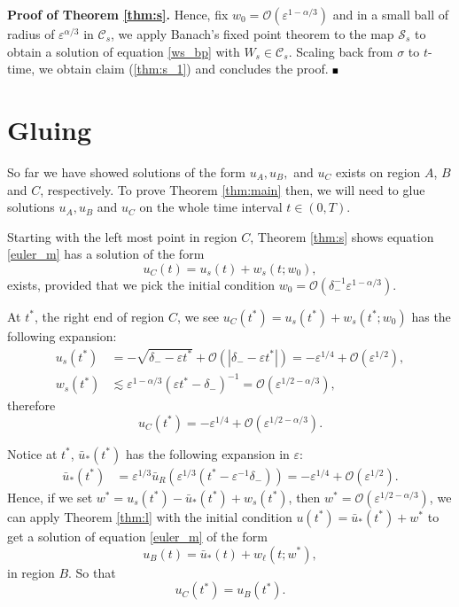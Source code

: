 \documentclass[letterpaper,11pt]{article}
\newcommand{\rmO}{\mathcal{O}}
\newcommand{\eps}{\varepsilon}
\newcommand{\lar}{ \lesssim }
\numberwithin{equation}{section}
\theoremstyle{plain}
\newenvironment{Proof}[1][.]%
 {\begin{trivlist}\item[]\textbf{Proof#1 }}%
 {\hspace*{\fill}$\rule{0.3\baselineskip}{0.35\baselineskip}$\end{trivlist}}
\begin{document}
\begin{Proof}[ of Theorem \ref{thm:s}.]
Hence, fix $w_0 = \rmO(\eps^{1-\alpha/3})$ and in a small ball of radius of $\eps^{\alpha/3}$ in $\mathcal{C}_s$, we apply Banach's fixed point theorem to the map $\mathcal{S}_s$ to obtain a solution of equation \eqref{ws_bp} with $W_s \in \mathcal{C}_s$. Scaling back from $\sigma$ to $t$-time, we obtain claim (\ref{thm:s_1}) and concludes the proof.
\end{Proof}

\section{Gluing}\label{sec_glue}
So far we have showed solutions of the form $u_A,u_B,$ and $u_C$ exists on region $A$, $B$ and $C$, respectively. To prove Theorem \ref{thm:main} then, we will need to glue solutions $u_A, u_B$ and $u_C$ on the whole time interval $t \in (0,T)$.

Starting with the left most point in region $C$, Theorem \ref{thm:s} shows equation \eqref{euler_m} has
a solution of the form
\[
u_C(t) = u_s(t) + w_s(t;w_0),
\]
exists, provided that we pick the initial condition $w_0= \rmO(\delta_-^{-1}\eps^{1-\alpha/3})$.

At $t^*$, the right end of region $C$, we see $u_C(t^*) = u_s(t^*) + w_s(t^*; w_0)$ has the following expansion:
\begin{align*}
u_s(t^*) &= -\sqrt{\delta_--\eps t^*}+\rmO(|\delta_--\eps t^*|) = -\eps^{1/4}+\rmO(\eps^{1/2}),\\
w_s(t^*) &\lar \eps^{1-\alpha/3}(\eps t^*-\delta_-)^{-1} =  \rmO(\eps^{1/2-\alpha/3}),
\end{align*}
therefore
\[
 u_C(t^*) = -\eps^{1/4} + \rmO(\eps^{1/2-\alpha/3}).
\]

Notice at $t^*$, $\bar{u}_*(t^*)$ has the following expansion in $\eps$:
\begin{align*}
\bar{u}_*(t^*) &= \eps^{1/3}\bar{u}_R(\eps^{1/3}(t^*-\eps^{-1}\delta_-)) = -\eps^{1/4}+ \rmO(\eps^{1/2}).
\end{align*}
Hence, if we set $w^* = u_s(t^*)-\bar{u}_*(t^*)+w_s(t^*)$, then $w^* = \rmO(\eps^{1/2-\alpha/3})$, we can apply Theorem \ref{thm:l} with the initial condition $u(t^*)=  \bar{u}_*(t^*) + w^*$ to get a solution of equation \eqref{euler_m} of the form
\[
u_B(t) = \bar{u}_*(t) + w_\ell(t; w^*),
\]
in region $B$. So that
\begin{equation} \label{match_bc}
u_C(t^*) = u_B(t^*).
\end{equation}
\end{document}
